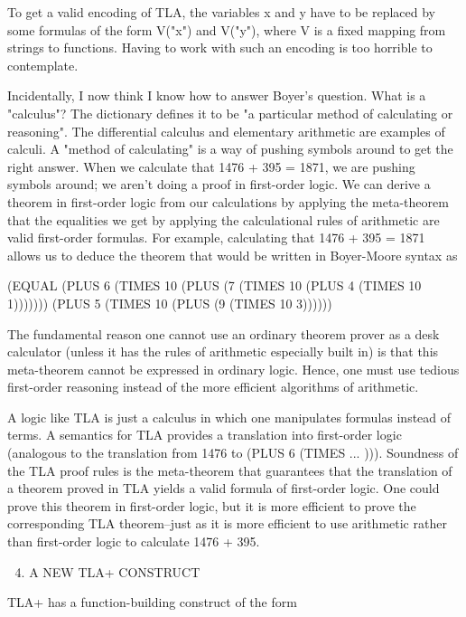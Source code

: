 \begin{spec}
To get a valid encoding of TLA, the variables x and y have to be
replaced by some formulas of the form V("x") and V("y"), where V is
a fixed mapping from strings to functions.  Having to work with such
an encoding is too horrible to contemplate.

Incidentally, I now think I know how to answer Boyer's question.
What is a "calculus"?  The dictionary defines it to be "a particular
method of calculating or reasoning".  The differential calculus and
elementary arithmetic are examples of calculi.  A "method of
calculating" is a way of pushing symbols around to get the right
answer.  When we calculate that 1476 + 395 = 1871, we are pushing
symbols around; we aren't doing a proof in first-order logic.  We
can derive a theorem in first-order logic from our calculations by
applying the meta-theorem that the equalities we get by applying the
calculational rules of arithmetic are valid first-order formulas.
For example, calculating that 1476 + 395 = 1871 allows us to deduce
the theorem that would be written in Boyer-Moore syntax as

  (EQUAL (PLUS 6
               (TIMES 10 
                      (PLUS (7
                            (TIMES 10
                                   (PLUS 4
                                         (TIMES 10 1)))))))
         (PLUS 5
               (TIMES 10 
                      (PLUS (9
                            (TIMES 10 3))))))

The fundamental reason one cannot use an ordinary theorem prover as
a desk calculator (unless it has the rules of arithmetic especially
built in) is that this meta-theorem cannot be expressed in ordinary
logic.  Hence, one must use tedious first-order reasoning instead of
the more efficient algorithms of arithmetic.

A logic like TLA is just a calculus in which one manipulates
formulas instead of terms.  A semantics for TLA provides a
translation into first-order logic (analogous to the translation
from 1476 to (PLUS 6 (TIMES ...  ))).  Soundness of the TLA proof
rules is the meta-theorem that guarantees that the translation of a
theorem proved in TLA yields a valid formula of first-order logic.
One could prove this theorem in first-order logic, but it is more
efficient to prove the corresponding TLA theorem--just as it is more
efficient to use arithmetic rather than first-order logic to
calculate 1476 + 395.  


4. A NEW TLA+ CONSTRUCT  

TLA+ has a function-building construct of the form


\end{spec}

